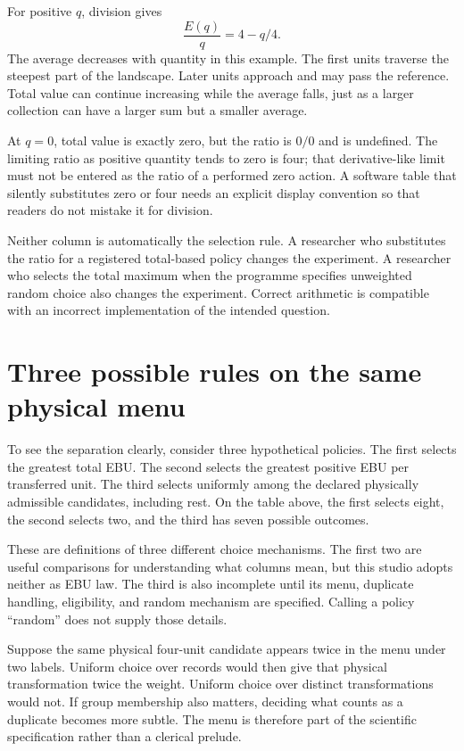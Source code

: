 For positive \(q\), division gives
\begin{equation}
\frac{E(q)}q=4-q/4.
\end{equation}
The average decreases with quantity in this example. The first units traverse the steepest part of the landscape. Later units approach and may pass the reference. Total value can continue increasing while the average falls, just as a larger collection can have a larger sum but a smaller average.

At \(q=0\), total value is exactly zero, but the ratio is \(0/0\) and is undefined. The limiting ratio as positive quantity tends to zero is four; that derivative-like limit must not be entered as the ratio of a performed zero action. A software table that silently substitutes zero or four needs an explicit display convention so that readers do not mistake it for division.

Neither column is automatically the selection rule. A researcher who substitutes the ratio for a registered total-based policy changes the experiment. A researcher who selects the total maximum when the programme specifies unweighted random choice also changes the experiment. Correct arithmetic is compatible with an incorrect implementation of the intended question.

\section{Three possible rules on the same physical menu}

To see the separation clearly, consider three hypothetical policies. The first selects the greatest total EBU. The second selects the greatest positive EBU per transferred unit. The third selects uniformly among the declared physically admissible candidates, including rest. On the table above, the first selects eight, the second selects two, and the third has seven possible outcomes.

These are definitions of three different choice mechanisms. The first two are useful comparisons for understanding what columns mean, but this studio adopts neither as EBU law. The third is also incomplete until its menu, duplicate handling, eligibility, and random mechanism are specified. Calling a policy ``random'' does not supply those details.

Suppose the same physical four-unit candidate appears twice in the menu under two labels. Uniform choice over records would then give that physical transformation twice the weight. Uniform choice over distinct transformations would not. If group membership also matters, deciding what counts as a duplicate becomes more subtle. The menu is therefore part of the scientific specification rather than a clerical prelude.

